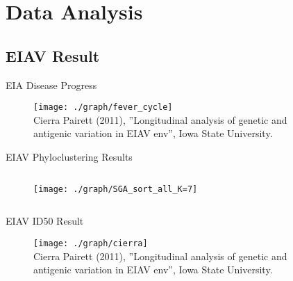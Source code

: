 \documentclass{beamer}
\begin{document}

\section{Data Analysis}

\subsection{EIAV Result}

\begin{frame}{EIA Disease Progress}

\vspace{-1.5cm}
\begin{center}
\hspace{-1.6cm}
\begin{figure}
  \texttt{[image: ./graph/fever\_cycle]}
  \\
  \vspace{-0.2cm}
  {\tiny Cierra Pairett (2011), ''Longitudinal analysis of genetic and antigenic
  variation in EIAV env'', Iowa State University.}
\end{figure}
\end{center}

\end{frame}


\begin{frame}{EIAV Phyloclustering Results}

\vspace{-1.0cm}
\begin{columns}

\hspace{-1.0cm}
\begin{column}{\textwidth}
\begin{figure}
  \texttt{[image: ./graph/SGA\_sort\_all\_K=7]}
\end{figure}
\end{column}

\end{columns}

\end{frame}


\begin{frame}{EIAV ID50 Result}

\vspace{-0.2cm}
\begin{figure}
  \texttt{[image: ./graph/cierra]}
  \\
  \vspace{-0.1cm}
  {\tiny Cierra Pairett (2011), ''Longitudinal analysis of genetic and antigenic
  variation in EIAV env'', Iowa State University.}
\end{figure}

\end{frame}
\end{document}
